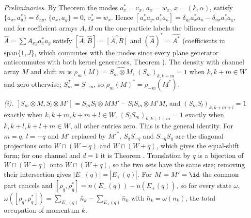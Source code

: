 \emph{Preliminaries.} By Theorem  the modes $a_{x}^{*} = v_{x}$, $a_{x} = w_{x}$, $x = (k, \alpha)$, satisfy $\{a_{x}, a_{y}^{*}\} = \delta_{xy}$, $\{a_{x}, a_{y}\} = 0$, $v_{x}^{*} = w_{x}$. Hence $[a_{x}^{*}a_{y}, a_{z}^{*}a_{u}] = \delta_{yz}a_{x}^{*}a_{u} - \delta_{ux}a_{z}^{*}a_{y}$, and for coefficient arrays $A, B$ on the one-particle labels the bilinear elements $\hat A = \sum A_{xy}a_{x}^{*}a_{y}$ satisfy $[\hat A, \hat B] = \widehat{[A, B]}$ and $(\hat A)^{*} = \widehat{A^{*}}$ (coefficients in $\mathrm{span}\{1, J\}$, which commutes with the modes since every plane generator anticommutes with both kernel generators, Theorem ). The density with channel array $M$ and shift $m$ is $\rho_{m}(M) = \widehat{S_{m}\otimes M}$, $(S_{m})_{k,k+m} = 1$ when $k, k + m \in W$ and zero otherwise; $S_{m}^{T} = S_{-m}$, so $\rho_{m}(M)^{*} = \rho_{-m}(M^{*})$.

\emph{(i).} $[S_{m}\otimes M, S_{l}\otimes M'] = S_{m}S_{l}\otimes MM' - S_{l}S_{m}\otimes M'M$, and $(S_{m}S_{l})_{k,k+m+l} = 1$ exactly when $k, k + m, k + m + l \in W$, $(S_{l}S_{m})_{k,k+l+m} = 1$ exactly when $k, k + l, k + l + m \in W$, all other entries zero. This is the general identity. For $m = q$, $l = -q$ and $M'$ replaced by $M'^{*}$, $S_{q}S_{-q}$ and $S_{-q}S_{q}$ are the diagonal projections onto $W \cap (W - q)$ and $W \cap (W + q)$, which gives the equal-shift form; for one channel and $d = 1$ it is Theorem . Translation by $q$ is a bijection of $W \cap (W - q)$ onto $W \cap (W + q)$, so the two sets have the same size; removing their intersection gives $|E_{-}(q)| = |E_{+}(q)|$. For $M = M' = \id$ the common part cancels and $[\rho_{q}, \rho_{q}^{*}] = n(E_{-}(q)) - n(E_{+}(q))$, so for every state $\omega$, $\omega([\rho_{q}, \rho_{q}^{*}]) = \sum_{E_{-}(q)}\bar n_{k} - \sum_{E_{+}(q)}\bar n_{k}$ with $\bar n_{k} = \omega(n_{k})$, the total occupation of momentum $k$.

